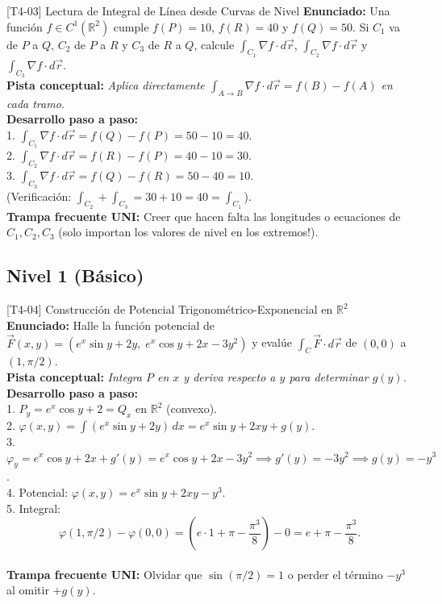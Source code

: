 \documentclass[11pt,a4paper]{article}
\begin{document}
\begin{ejerciciobox}{[T4-03] Lectura de Integral de Línea desde Curvas de Nivel}
\textbf{Enunciado:} Una función $f \in C^1(\mathbb{R}^2)$ cumple $f(P) = 10$, $f(R) = 40$ y $f(Q) = 50$. Si $C_1$ va de $P$ a $Q$, $C_2$ de $P$ a $R$ y $C_3$ de $R$ a $Q$, calcule $\int_{C_1} \nabla f\cdot d\vec{r}$, $\int_{C_2} \nabla f\cdot d\vec{r}$ y $\int_{C_3} \nabla f\cdot d\vec{r}$.\\[0.2cm]
\textbf{Pista conceptual:} \emph{Aplica directamente $\int_{A\to B} \nabla f\cdot d\vec{r} = f(B) - f(A)$ en cada tramo.}\\[0.2cm]
\textbf{Desarrollo paso a paso:}\\
1. $\int_{C_1} \nabla f\cdot d\vec{r} = f(Q) - f(P) = 50 - 10 = 40$.\\
2. $\int_{C_2} \nabla f\cdot d\vec{r} = f(R) - f(P) = 40 - 10 = 30$.\\
3. $\int_{C_3} \nabla f\cdot d\vec{r} = f(Q) - f(R) = 50 - 40 = 10$.\\
(Verificación: $\int_{C_2} + \int_{C_3} = 30 + 10 = 40 = \int_{C_1}$).\\[0.2cm]
\textbf{Trampa frecuente UNI:} Creer que hacen falta las longitudes o ecuaciones de $C_1, C_2, C_3$ (solo importan los valores de nivel en los extremos!).
\end{ejerciciobox}

\subsection{Nivel 1 (Básico)}

\begin{ejerciciobox}{[T4-04] Construcción de Potencial Trigonométrico-Exponencial en $\mathbb{R}^2$}
\textbf{Enunciado:} Halle la función potencial de $\vec{F}(x,y) = (e^x\sin y + 2y,\; e^x\cos y + 2x - 3y^2)$ y evalúe $\int_C \vec{F}\cdot d\vec{r}$ de $(0,0)$ a $(1, \pi/2)$.\\[0.2cm]
\textbf{Pista conceptual:} \emph{Integra $P$ en $x$ y deriva respecto a $y$ para determinar $g(y)$.}\\[0.2cm]
\textbf{Desarrollo paso a paso:}\\
1. $P_y = e^x\cos y + 2 = Q_x$ en $\mathbb{R}^2$ (convexo).\\
2. $\varphi(x,y) = \int (e^x\sin y + 2y)\,dx = e^x\sin y + 2xy + g(y)$.\\
3. $\varphi_y = e^x\cos y + 2x + g'(y) = e^x\cos y + 2x - 3y^2 \implies g'(y) = -3y^2 \implies g(y) = -y^3$.\\
4. Potencial: $\varphi(x,y) = e^x\sin y + 2xy - y^3$.\\
5. Integral:\\
$$\varphi(1,\pi/2) - \varphi(0,0) = \left(e\cdot 1 + \pi - \frac{\pi^3}{8}\right) - 0 = e + \pi - \frac{\pi^3}{8}.$$\\[0.2cm]
\textbf{Trampa frecuente UNI:} Olvidar que $\sin(\pi/2)=1$ o perder el término $-y^3$ al omitir $+g(y)$.
\end{ejerciciobox}
\end{document}
